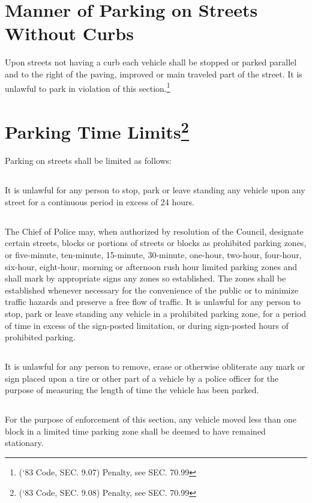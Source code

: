 \section{Manner of Parking on Streets Without Curbs}
Upon streets not having a curb each vehicle shall be stopped or parked parallel and to the right of the paving, improved or main traveled part of the street.  It is unlawful to park in violation of this section.\footnote{(‘83 Code, SEC. 9.07)  Penalty, see SEC. 70.99}

\section{Parking Time Limits\footnote{(‘83 Code, SEC. 9.08)  Penalty, see SEC. 70.99}}
Parking on streets shall be limited as follows:
\subsection{}
It is unlawful for any person to stop, park or leave standing any vehicle upon any street for a continuous period in excess of 24 hours.
\subsection{}
The Chief of Police may, when authorized by resolution of the Council, designate certain streets, blocks or portions of streets or blocks as prohibited parking zones, or five-minute, ten-minute, 15-minute, 30-minute, one-hour, two-hour, four-hour, six-hour, eight-hour, morning or afternoon rush hour limited parking zones and shall mark by appropriate signs any zones so established.  The zones shall be established whenever necessary for the convenience of the public or to minimize traffic hazards and preserve a free flow of traffic.  It is unlawful for any person to stop, park or leave standing any vehicle in a prohibited parking zone, for a period of time in excess of the sign-posted limitation, or during sign-posted hours of prohibited parking.
\subsection{}
It is unlawful for any person to remove, erase or otherwise obliterate any mark or sign placed upon a tire or other part of a vehicle by a police officer for the purpose of measuring the length of time the vehicle has been parked.
\subsection{}
For the purpose of enforcement of this section, any vehicle moved less than one block in a limited time parking zone shall be deemed to have remained stationary.
